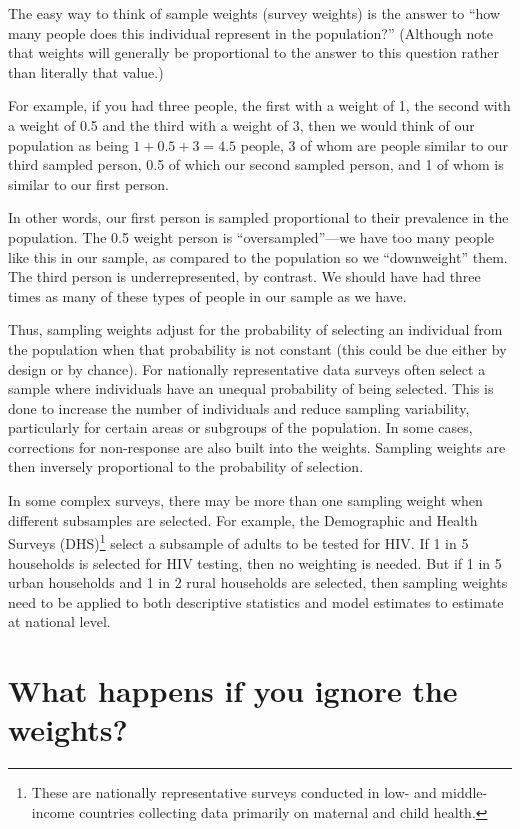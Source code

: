 \documentclass[
  letterpaper,
  DIV=11,
  numbers=noendperiod]{scrreprt}
\begin{document}
The easy way to think of sample weights (survey weights) is the answer
to ``how many people does this individual represent in the population?''
(Although note that weights will generally be proportional to the answer
to this question rather than literally that value.)

For example, if you had three people, the first with a weight of 1, the
second with a weight of 0.5 and the third with a weight of 3, then we
would think of our population as being \(1 + 0.5 + 3 = 4.5\) people, 3
of whom are people similar to our third sampled person, 0.5 of which our
second sampled person, and 1 of whom is similar to our first person.

In other words, our first person is sampled proportional to their
prevalence in the population. The 0.5 weight person is
``oversampled''---we have too many people like this in our sample, as
compared to the population so we ``downweight'' them. The third person
is underrepresented, by contrast. We should have had three times as many
of these types of people in our sample as we have.

Thus, sampling weights adjust for the probability of selecting an
individual from the population when that probability is not constant
(this could be due either by design or by chance). For nationally
representative data surveys often select a sample where individuals have
an unequal probability of being selected. This is done to increase the
number of individuals and reduce sampling variability, particularly for
certain areas or subgroups of the population. In some cases, corrections
for non-response are also built into the weights. Sampling weights are
then inversely proportional to the probability of selection.

In some complex surveys, there may be more than one sampling weight when
different subsamples are selected. For example, the Demographic and
Health Surveys (DHS)\footnote{These are nationally representative
  surveys conducted in low- and middle-income countries collecting data
  primarily on maternal and child health.} select a subsample of adults
to be tested for HIV. If 1 in 5 households is selected for HIV testing,
then no weighting is needed. But if 1 in 5 urban households and 1 in 2
rural households are selected, then sampling weights need to be applied
to both descriptive statistics and model estimates to estimate at
national level.

\hypertarget{what-happens-if-you-ignore-the-weights}{%
\section{What happens if you ignore the
weights?}\label{what-happens-if-you-ignore-the-weights}}
\end{document}
